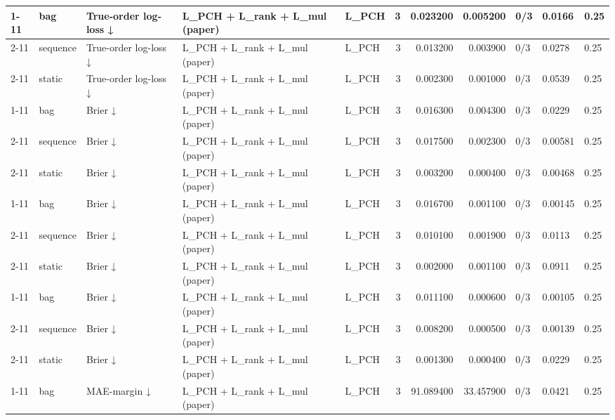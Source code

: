 \begin{tabular}{lllllrrrlll}
\cline{1-11} \cline{2-11} \cline{3-11}
\multirow[t]{3}{*}{ehrsim2\_order} & bag & True-order log-loss ↓ & L\_PCH + L\_rank + L\_mul (paper) & L\_PCH & 3 & 0.023200 & 0.005200 & 0/3 & 0.0166 & 0.25 \\
\cline{2-11} \cline{3-11}
 & sequence & True-order log-loss ↓ & L\_PCH + L\_rank + L\_mul (paper) & L\_PCH & 3 & 0.013200 & 0.003900 & 0/3 & 0.0278 & 0.25 \\
\cline{2-11} \cline{3-11}
 & static & True-order log-loss ↓ & L\_PCH + L\_rank + L\_mul (paper) & L\_PCH & 3 & 0.002300 & 0.001000 & 0/3 & 0.0539 & 0.25 \\
\cline{1-11} \cline{2-11} \cline{3-11}
\multirow[t]{3}{*}{ehrsim2\_level} & bag & Brier ↓ & L\_PCH + L\_rank + L\_mul (paper) & L\_PCH & 3 & 0.016300 & 0.004300 & 0/3 & 0.0229 & 0.25 \\
\cline{2-11} \cline{3-11}
 & sequence & Brier ↓ & L\_PCH + L\_rank + L\_mul (paper) & L\_PCH & 3 & 0.017500 & 0.002300 & 0/3 & 0.00581 & 0.25 \\
\cline{2-11} \cline{3-11}
 & static & Brier ↓ & L\_PCH + L\_rank + L\_mul (paper) & L\_PCH & 3 & 0.003200 & 0.000400 & 0/3 & 0.00468 & 0.25 \\
\cline{1-11} \cline{2-11} \cline{3-11}
\multirow[t]{3}{*}{ehrsim2\_mixed} & bag & Brier ↓ & L\_PCH + L\_rank + L\_mul (paper) & L\_PCH & 3 & 0.016700 & 0.001100 & 0/3 & 0.00145 & 0.25 \\
\cline{2-11} \cline{3-11}
 & sequence & Brier ↓ & L\_PCH + L\_rank + L\_mul (paper) & L\_PCH & 3 & 0.010100 & 0.001900 & 0/3 & 0.0113 & 0.25 \\
\cline{2-11} \cline{3-11}
 & static & Brier ↓ & L\_PCH + L\_rank + L\_mul (paper) & L\_PCH & 3 & 0.002000 & 0.001100 & 0/3 & 0.0911 & 0.25 \\
\cline{1-11} \cline{2-11} \cline{3-11}
\multirow[t]{3}{*}{ehrsim2\_order} & bag & Brier ↓ & L\_PCH + L\_rank + L\_mul (paper) & L\_PCH & 3 & 0.011100 & 0.000600 & 0/3 & 0.00105 & 0.25 \\
\cline{2-11} \cline{3-11}
 & sequence & Brier ↓ & L\_PCH + L\_rank + L\_mul (paper) & L\_PCH & 3 & 0.008200 & 0.000500 & 0/3 & 0.00139 & 0.25 \\
\cline{2-11} \cline{3-11}
 & static & Brier ↓ & L\_PCH + L\_rank + L\_mul (paper) & L\_PCH & 3 & 0.001300 & 0.000400 & 0/3 & 0.0229 & 0.25 \\
\cline{1-11} \cline{2-11} \cline{3-11}
\multirow[t]{3}{*}{ehrsim2\_level} & bag & MAE-margin ↓ & L\_PCH + L\_rank + L\_mul (paper) & L\_PCH & 3 & 91.089400 & 33.457900 & 0/3 & 0.0421 & 0.25 \\

\end{tabular}
